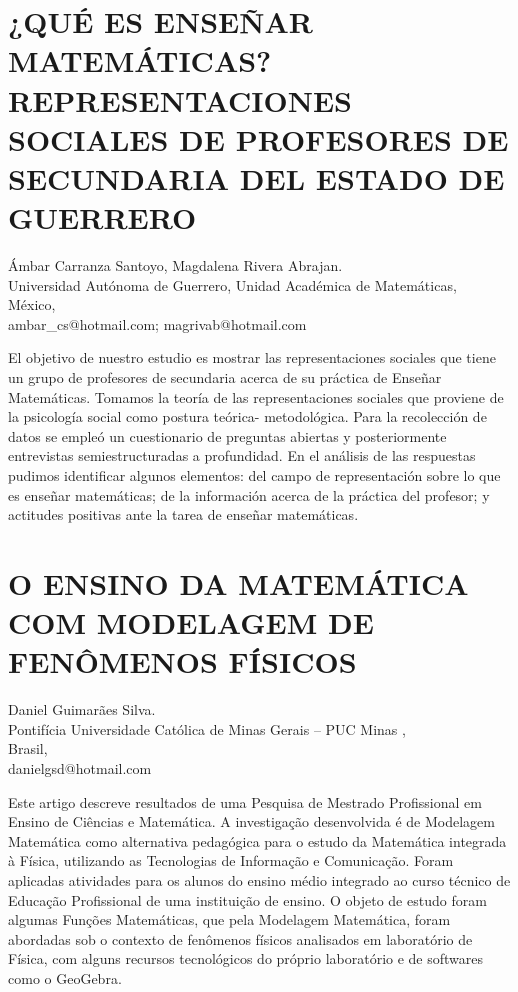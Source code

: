 \section{¿QUÉ ES ENSEÑAR MATEMÁTICAS? REPRESENTACIONES SOCIALES DE PROFESORES
DE SECUNDARIA DEL ESTADO DE GUERRERO }

\begin{datos}
Ámbar Carranza Santoyo, Magdalena Rivera Abrajan.\\
Universidad Autónoma de Guerrero, Unidad Académica de Matemáticas,\\
\hfill  México, \\
\hfill ambar\_{}cs@hotmail.com; magrivab@hotmail.com 
\end{datos}

El objetivo de nuestro estudio es mostrar las representaciones sociales
que tiene un grupo de profesores de secundaria acerca de su práctica
de Enseñar Matemáticas. Tomamos la teoría de las representaciones
sociales que proviene de la psicología social como postura teórica-
metodológica. Para la recolección de datos se empleó un cuestionario
de preguntas abiertas y posteriormente entrevistas semiestructuradas
a profundidad. En el análisis de las respuestas pudimos identificar
algunos elementos: del campo de representación sobre lo que es enseñar
matemáticas; de la información acerca de la práctica del profesor;
y actitudes positivas ante la tarea de enseñar matemáticas.


\section{O ENSINO DA MATEMÁTICA COM MODELAGEM DE FENÔMENOS FÍSICOS}

\begin{datos}
Daniel Guimarães Silva.\\
Pontifícia Universidade Católica de Minas Gerais – PUC Minas ,\\
\hfill  Brasil, \\
\hfill danielgsd@hotmail.com 
\end{datos}

Este artigo descreve resultados de uma Pesquisa de Mestrado Profissional
em Ensino de Ciências e Matemática. A investigação desenvolvida é
de Modelagem Matemática como alternativa pedagógica para o estudo
da Matemática integrada à Física, utilizando as Tecnologias de Informação
e Comunicação. Foram aplicadas atividades para os alunos do ensino
médio integrado ao curso técnico de Educação Profissional de uma instituição
de ensino. O objeto de estudo foram algumas Funções Matemáticas, que
pela Modelagem Matemática, foram abordadas sob o contexto de fenômenos
físicos analisados em laboratório de Física, com alguns recursos tecnológicos
do próprio laboratório e de softwares como o GeoGebra. 


